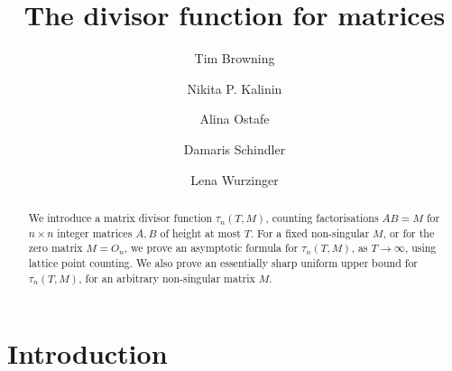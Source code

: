 \documentclass[11pt,reqno]{amsart}
\theoremstyle{definition}
\theoremstyle{remark}
\numberwithin{equation}{section}
\numberwithin{thm}{section}
\numberwithin{table}{section}
\begin{document}
\makeatletter
\def\subjclassname{$2020$ Mathematics Subject Classification}
\makeatother




\title{The divisor function for matrices}


\author[T. Browning]{Tim Browning}
\address{IST Austria\\
Am Campus 1\\
3400 Klosterneuburg\\
Austria}


\author[N.  Kalinin]{Nikita P. Kalinin}

\author[A. Ostafe]{Alina Ostafe}
\address{School of Mathematics and Statistics, University of New South Wales, Sydney NSW 2052, Australia}



\author[D. Schindler]{Damaris Schindler}
\address{University of G\"ottingen\\
Bunsenstraße 3--5\\
37073 G\"ottingen\\
Germany}

\author[L. Wurzinger]{Lena Wurzinger}

 
 
\begin{abstract}  
We introduce a matrix divisor function 
$\tau_n(T,M)$, counting factorisations $AB=M$ for 
$n\times n$ integer matrices $A,B$ of height  at most $T$. For a fixed non-singular $M$, 
or for the zero matrix $M=O_n$, we prove 
an asymptotic formula for 
$\tau_n(T,M)$, as $T\to \infty$, using lattice point counting. We also prove an essentially sharp uniform   
upper bound for $\tau_n(T,M)$, for an arbitrary non-singular matrix $M$.
\end{abstract} 



\maketitle

\thispagestyle{empty}
 \setcounter{tocdepth}{1}
 \tableofcontents


\section{Introduction}
\end{document}
